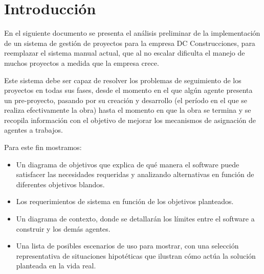 \section{Introducción}
En el siguiente documento se presenta el análisis preliminar de la implementación de un sistema de gestión de proyectos para la empresa DC Construcciones, para reemplazar el sistema manual actual, que al no escalar dificulta el manejo de muchos proyectos a medida que la empresa crece.

Este sistema debe ser capaz de resolver los problemas de seguimiento de los proyectos en todas sus fases, desde el momento en el que algún agente presenta un pre-proyecto, pasando por su creación y desarrollo (el período en el que se realiza efectivamente la obra) hasta el momento en que la obra se termina y se recopila información con el objetivo de mejorar los mecanismos de asignación de agentes a trabajos.

Para este fin mostramos:
\begin{itemize}
	\item Un diagrama de objetivos que explica de qué manera el software puede satisfacer las necesidades requeridas y analizando alternativas en función de diferentes objetivos blandos.
	\item Los requerimientos de sistema en función de los objetivos planteados.
	\item Un diagrama de contexto, donde se detallarán los límites entre el software a construir y los demás agentes. \item Una lista de posibles escenarios de uso para mostrar, con una selección representativa de situaciones hipotéticas que ilustran cómo actúa la solución planteada en la vida real.
\end{itemize}
